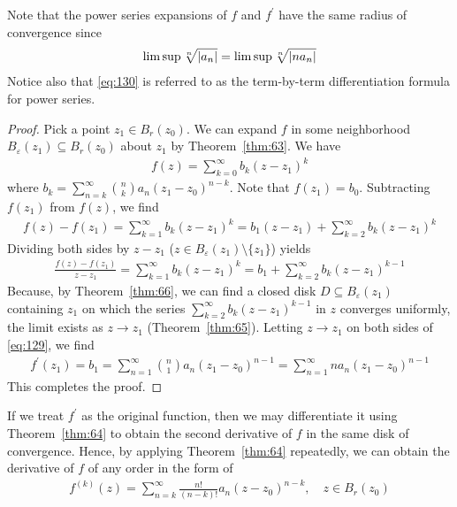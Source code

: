 \documentclass[thmcnt=section, 12pt]{my-elegantbook}
\begin{document}
\begin{note}
    Note that the power series expansions of $f$ and $f^\prime$ have the same radius of convergence since
    \begin{align*}
        \limsup{\sqrt[n]{\left\lvert a_n \right\rvert}}
        = \limsup{\sqrt[n]{\left\lvert n a_n \right\rvert}}
    \end{align*}
    Notice also that \eqref{eq:130} is referred to as the term-by-term differentiation formula for power series.
\end{note}

\begin{proof}
    Pick a point $z_1 \in B_r(z_0)$. We can expand $f$ in some neighborhood $B_{\varepsilon}(z_1) \subseteq B_r(z_0)$ about $z_1$ by Theorem~\ref{thm:63}. We have
    \begin{align*}
        f(z) = \sum_{k=0}^\infty b_k (z - z_1)^k
    \end{align*}
    where $b_k = \sum_{n=k}^\infty \binom{n}{k} a_n (z_1 - z_0)^{n-k}$. Note that $f(z_1) = b_0$. Subtracting $f(z_1)$ from $f(z)$, we find
    \begin{align*}
        f(z) - f(z_1)
        = \sum_{k=1}^\infty b_k (z - z_1)^k
        = b_1 (z - z_1) + \sum_{k=2}^\infty b_k (z - z_1)^k
    \end{align*}
    Dividing both sides by $z - z_1$ ($z \in B_\varepsilon(z_1) \setminus \{z_1\}$) yields
    \begin{align}
        \frac{f(z) - f(z_1)}{z - z_1}
        = \sum_{k=1}^\infty b_k (z - z_1)^k
        = b_1 + \sum_{k=2}^\infty b_k (z - z_1)^{k-1}
        \label{eq:129}
    \end{align}
    Because, by Theorem~\ref{thm:66}, we can find a closed disk $D \subseteq B_{\varepsilon}(z_1)$ containing $z_1$ on which the series $\sum_{k=2}^\infty b_k (z - z_1)^{k-1}$ in $z$ converges uniformly, the limit exists as $z \to z_1$ (Theorem~\ref{thm:65}). Letting $z \to z_1$ on both sides of \eqref{eq:129}, we find
    \begin{align*}
        f^\prime(z_1)
        = b_1
        = \sum_{n=1}^\infty \binom{n}{1} a_n (z_1 - z_0)^{n-1}
        = \sum_{n=1}^\infty n a_n (z_1 - z_0)^{n-1}
    \end{align*}
    This completes the proof.
\end{proof}

If we treat $f^\prime$ as the original function, then we may differentiate it using Theorem~\ref{thm:64} to obtain the second derivative of $f$ in the same disk of convergence. Hence, by applying Theorem~\ref{thm:64} repeatedly, we can obtain the derivative of $f$ of any order in the form of
\begin{align}
    f^{(k)}(z)
    = \sum_{n=k}^\infty \frac{n!}{(n-k)!} a_n (z - z_0)^{n-k},
    \quad z \in B_r(z_0)
    \label{eq:131}
\end{align}
\end{document}
